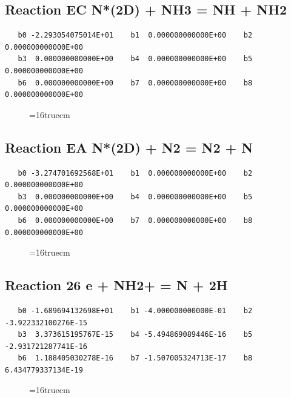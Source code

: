 \documentclass[12pt,dvipdfm]{article}
\begin{document}
\subsection{
Reaction EC N*(2D) + NH3  = NH + NH2}
\begin{small}\begin{verbatim}
   b0 -2.293054075014E+01    b1  0.000000000000E+00    b2  0.000000000000E+00
   b3  0.000000000000E+00    b4  0.000000000000E+00    b5  0.000000000000E+00
   b6  0.000000000000E+00    b7  0.000000000000E+00    b8  0.000000000000E+00
   \end{verbatim}\end{small}
\begin{figure}[h!]
\label{n2rates}
\epsfxsize=16truecm
\end{figure}
\newpage

\subsection{
Reaction EA 	N*(2D) + N2 =  N2 + N}
\begin{small}\begin{verbatim}
   b0 -3.274701692568E+01    b1  0.000000000000E+00    b2  0.000000000000E+00
   b3  0.000000000000E+00    b4  0.000000000000E+00    b5  0.000000000000E+00
   b6  0.000000000000E+00    b7  0.000000000000E+00    b8  0.000000000000E+00
   \end{verbatim}\end{small}
\begin{figure}[h!]
\label{n2rates}
\epsfxsize=16truecm
\end{figure}
\newpage

\subsection{
Reaction 26 e + NH2+ = N + 2H}
\begin{small}\begin{verbatim}
   b0 -1.689694132698E+01    b1 -4.000000000000E-01    b2 -3.922332100276E-15
   b3  3.373615195767E-15    b4 -5.494869089446E-16    b5 -2.931721287741E-16
   b6  1.188405030278E-16    b7 -1.507005324713E-17    b8  6.434779337134E-19
   \end{verbatim}\end{small}
\begin{figure}[h!]
\label{n2rates}
\epsfxsize=16truecm
\end{figure}
\newpage
\end{document}
